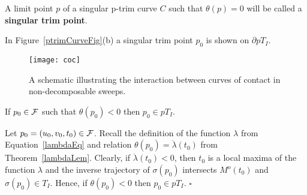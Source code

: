 \documentclass{elsart5p}
\newcommand{\eat}[1]{}
\begin{document}
\eat{For $p \in {\cal F}$, let $t(p)$ denote the $t$-coordinate of $p$.  By 
Lemma~\ref{trimCLem} it follows that for each $p_n \in (p_n)$ there exists $p'_n \in C$ 
such that $\sigma(p_n) = \sigma(p'_n)$.  Since $\displaystyle \lim_{n \to \infty} \| t(p_n) -t(p'_n) \| = 0$ 
and $\partial M$ is free from self-intersections, we have that $\displaystyle \lim_{n \to \infty} \| p_n - p'_n \| = 0$. 
Hence, for a small neighborhood ${\cal N}$ of $p_0$ in ${\cal F}$,
assuming $C \cap {\cal N}$ is a smooth curve,  we may parametrize 
$C \cap {\cal N}$ by a map $\gamma$ so that $\gamma(0) = p_0$ and 
$\sigma(\gamma(-s)) = \sigma(\gamma(s))$ for $\gamma(-s), \gamma(s) \in {\cal N} \cap C - p_0$.  
Let $\Gamma(s) := \sigma(\gamma(s))$.  Then, 
\begin{align*}
\frac{d \Gamma}{ds}| _{0} =& \displaystyle \lim_{\Delta s \to 0} \frac{\Gamma(\Delta s) - \Gamma(0)}{\Delta s} 
				= \lim_{\Delta s \to 0} \frac{\Gamma(0) - \Gamma(-\Delta s)}{\Delta s}\\
				=& \lim_{\Delta s \to 0} \frac{\Gamma(0) - \Gamma(\Delta s)}{\Delta s} 
				= \displaystyle -\lim_{\Delta s \to 0} \frac{\Gamma(\Delta s) - \Gamma(0)}{\Delta s} 
\end{align*}

Hence, 
\begin{align*}
\frac{d \Gamma}{ds}\arrowvert _{0} = J_{\sigma}|_{\gamma(0)}. \frac{d \gamma}{ds}|_{0} = 0
\end{align*}
Since $\frac{d \gamma}{ds}|_{0} \in \mathcal{T}_{\mathcal{F}}(p_0)$, 
the map $\sigma|_{{\cal F}}: {\cal F} \to C_I$ fails to be an immersion at $p_0$ 
and by Lemma~\ref{singLem} we conclude that $\theta(p_0) = 0$.
\hfill $\square$.
}

\begin{defn} \label{singTrimPtDef}
A limit point $p$ of a singular p-trim curve $C$ such that $\theta(p)=0$ will be called a 
{\bf singular trim point}.
\end{defn}

In Figure~\ref{ptrimCurveFig}(b) a singular trim point $p_0$ is shown on $\partial pT_I$.


\begin{figure}
 \centering
  \texttt{[image: coc]}
  \caption{A schematic illustrating the interaction between curves of contact in non-decomposable sweeps.}
 \label{cocFig}
\end{figure}

\begin{prop} \label{thetaNegLem}
If $p_0 \in {\cal F}$ such that $\theta(p_0) < 0$ then $p_0 \in pT_I$.
\end{prop}
Let $p_0 = (u_0, v_0, t_0) \in {\cal F}$.
Recall the definition of the function $\lambda$ from Equation~\ref{lambdaEq} and relation 
$\theta(p_0) = \ddot{\lambda}(t_0)$ from Theorem~\ref{lambdaLem}.  Clearly, if $\ddot{\lambda}(t_0) < 0$,  
then $t_0$ is a local maxima of the function $\lambda$ and the inverse trajectory of $\sigma(p_0)$ intersects 
$M^o(t_0)$ and $\sigma(p_0) \in T_I$.  Hence, if $\theta(p_0) < 0$ then $p_0 \in pT_I$.
\hfill $\square$
\end{document}
